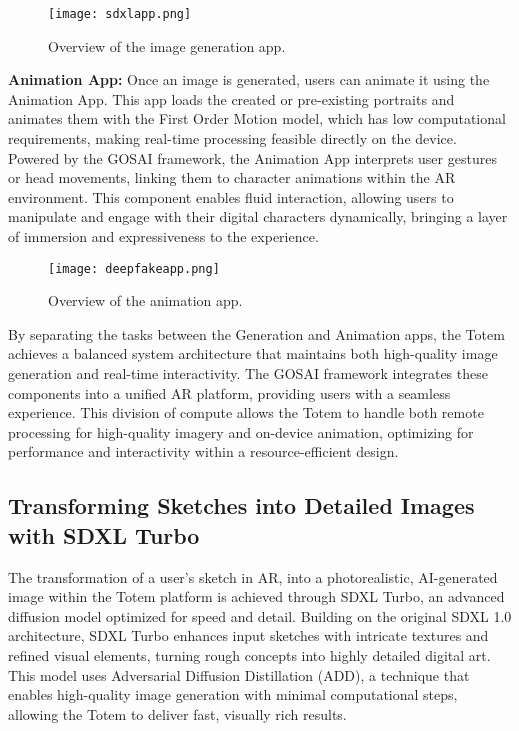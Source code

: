 \begin{figure}[!h]
    \centering
    \texttt{[image: sdxlapp.png]}
    \caption{Overview of the image generation app.}
    \vspace{0.1cm}
    \label{fig:imgenapp}
\end{figure}

\textbf{Animation App:} Once an image is generated, users can animate it using the Animation App.
This app loads the created or pre-existing portraits and animates them with the First Order Motion model, which has low computational requirements, making real-time processing feasible directly on the device.
Powered by the GOSAI framework, the Animation App interprets user gestures or head movements, linking them to character animations within the AR environment.
This component enables fluid interaction, allowing users to manipulate and engage with their digital characters dynamically, bringing a layer of immersion and expressiveness to the experience.

\begin{figure}[!h]
    \centering
    \texttt{[image: deepfakeapp.png]}
    \caption{Overview of the animation app.}
    \vspace{0.1cm}
    \label{fig:deepfakeapp}
\end{figure}

By separating the tasks between the Generation and Animation apps, the Totem achieves a balanced system architecture that maintains both high-quality image generation and real-time interactivity.
The GOSAI framework integrates these components into a unified AR platform, providing users with a seamless experience.
This division of compute allows the Totem to handle both remote processing for high-quality imagery and on-device animation, optimizing for performance and interactivity within a resource-efficient design.

\subsection{Transforming Sketches into Detailed Images with SDXL Turbo}

The transformation of a user’s sketch in AR, into a photorealistic, AI-generated image within the Totem platform is achieved through SDXL Turbo\cite{sauer2023adversarial}, an advanced diffusion model optimized for speed and detail.
Building on the original SDXL 1.0 architecture, SDXL Turbo enhances input sketches with intricate textures and refined visual elements, turning rough concepts into highly detailed digital art.
This model uses Adversarial Diffusion Distillation (ADD), a technique that enables high-quality image generation with minimal computational steps, allowing the Totem to deliver fast, visually rich results.

